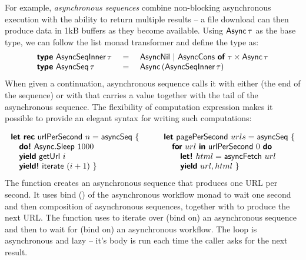 \documentclass[runningheads,a4paper]{llncs}
\begin{document}
For example, \emph{asynchronous sequences} \cite{async-seq} combine non-blocking asynchronous 
execution with the ability to return multiple results -- a file download can then produce data 
in 1kB buffers as they become available. Using $\textnormal{\sffamily Async}\,\tau$ as the base type, we can
follow the list monad transformer \cite{list-trans} and define the type as:
%
\begin{equation*}
\begin{array}{lcl}
\kvd{type}~\ident{AsyncSeqInner}\,\tau &~=~& \ident{AsyncNil} ~|~
    \ident{AsyncCons}~\kvd{of}~\tau \times \ident{Async}\,\tau \\
\kvd{type}~\ident{AsyncSeq}\,\tau &=& \ident{Async}\,(\ident{AsyncSeqInner}\,\tau)
\end{array}
\end{equation*}
%
When given a continuation, asynchronous sequence calls it with either 
(the end of the sequence) or with  that carries a value together with
the tail of the asynchronous sequence. The flexibility of computation expression 
makes it possible to provide an elegant syntax for writing such computations:

\begin{equation*}
\begin{array}{l}
\kvd{let rec}~\ident{urlPerSecond}~n = \ident{asyncSeq}~\{ \\
\quad \kvd{do!}~\ident{Async}.\ident{Sleep}~1000 \\
\quad \kvd{yield}~\ident{getUrl}~i \\
\quad \kvd{yield!}~\ident{iterate}~(i+1) ~\}
\end{array}
\qquad
\begin{array}{l}
\kvd{let}~\ident{pagePerSecond}~urls = \ident{asyncSeq}~\{ \\
\quad \kvd{for}~url~\kvd{in}~\ident{urlPerSecond}~0~\kvd{do}\\
\quad\quad \kvd{let!}~html = \ident{asyncFetch}~url \\
\quad\quad \kvd{yield}~url, html ~\}
\end{array}
\end{equation*}
%
The  function creates an asynchronous sequence that produces one URL per
second. It uses bind () of the asynchronous workflow monad to wait one second
and then composition of asynchronous sequences, together with  to produce the 
next URL. The  function uses  to iterate over (bind on) an
asynchronous sequence and then  to wait for (bind on) an asynchronous workflow.
The  loop is asynchronous and lazy -- it's body is run each time the caller asks 
for the next result.
\end{document}
